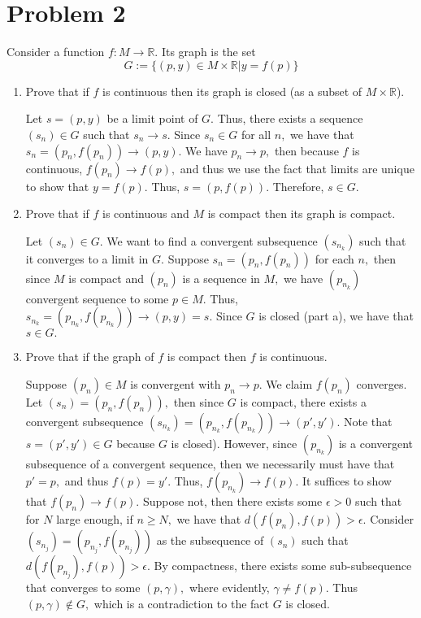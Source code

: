 \documentclass[11pt]{article}
\newcommand{\bbR}{\mathbb{R}}
\begin{document}
\section*{Problem 2}
\begin{problem}
    Consider a function $f: M \to \bbR.$ Its graph is the set \[G := \{(p,y)\in M \times \bbR | y = f(p)\}\]
\end{problem}
\begin{enumerate}
    \item 
    \begin{problem}
        Prove that if $f$ is continuous then its graph is closed (as a subset of $M\times \bbR$).
    \end{problem}
    \begin{solution}
        Let $s = (p,y)$ be a limit point of $G.$ Thus, there exists a sequence $(s_n)\in G$ such that $s_n \to s.$ Since $s_n \in G$ for all $n,$ we have that $s_n = (p_n, f(p_n)) \to (p,y).$ We have $p_n \to p,$ then because $f$ is continuous, $f(p_n)\to f(p),$ and thus we use the fact that limits are unique to show that $y = f(p).$ Thus, $s = (p,f(p)).$ Therefore, $s\in G.$
    \end{solution}
    \item 
    \begin{problem}
        Prove that if $f$ is continuous and $M$ is compact then its graph is compact.
    \end{problem}
    \begin{solution}
        Let $(s_n)\in G.$ We want to find a convergent subsequence $(s_{n_k})$ such that it converges to a limit in $G.$ Suppose $s_n = (p_n, f(p_n))$ for each $n,$ then since $M$ is compact and $(p_n)$ is a sequence in $M,$ we have $(p_{n_k})$ convergent sequence to some $p\in M.$ Thus, $s_{n_k} = (p_{n_k}, f(p_{n_k}))\to (p,y) = s.$ Since $G$ is closed (part a), we have that $s\in G.$
    \end{solution}
    \item 
    \begin{problem}
        Prove that if the graph of $f$ is compact then $f$ is continuous.
    \end{problem}
    \begin{solution}
        Suppose $(p_n)\in M$ is convergent with $p_n \to p.$ We claim $f(p_n)$ converges. Let $(s_n) = (p_n, f(p_n)),$ then since $G$ is compact, there exists a convergent subsequence $(s_{n_k}) = (p_{n_k}, f(p_{n_k}))\to (p', y').$ Note that $s = (p',y') \in G$ because $G$ is closed). However, since $(p_{n_k})$ is a convergent subsequence of a convergent sequence, then we necessarily must have that $p' = p,$ and thus $f(p) = y'.$ Thus, $f(p_{n_k})\to f(p).$ It suffices to show that $f(p_n)\to f(p).$ Suppose not, then there exists some $\epsilon>0$ such that for $N$ large enough, if $n\geq N,$ we have that $d(f(p_n), f(p)) >\epsilon.$ Consider $(s_{n_j}) = (p_{n_j}, f(p_{n_j}))$ as the subsequence of $(s_n)$ such that $d(f(p_{n_j}), f(p))>\epsilon.$ By compactness, there exists some sub-subsequence that converges to some $(p, \gamma),$ where evidently, $\gamma \neq f(p).$ Thus $(p,\gamma)\notin G,$ which is a contradiction to the fact $G$ is closed.  

\end{solution}
\end{enumerate}
\end{document}
